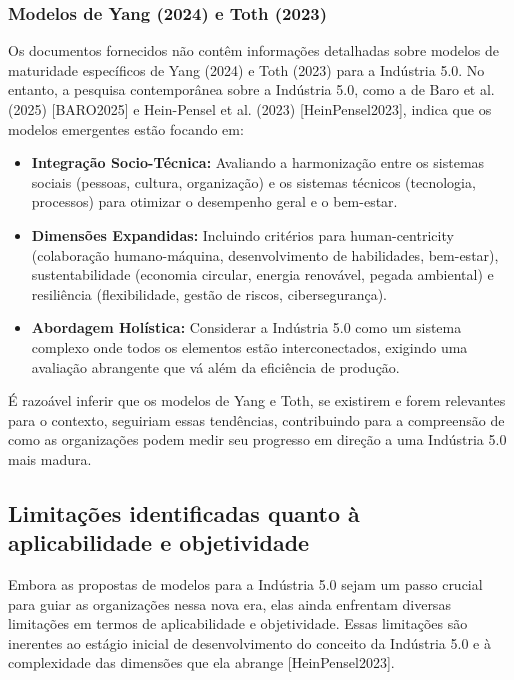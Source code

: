 \subsubsection{Modelos de Yang (2024) e Toth (2023)}

Os documentos fornecidos não contêm informações detalhadas sobre modelos de maturidade específicos de Yang (2024) e Toth (2023) para a Indústria 5.0. No entanto, a pesquisa contemporânea sobre a Indústria 5.0, como a de Baro et al. (2025) [BARO2025] e Hein-Pensel et al. (2023) [HeinPensel2023], indica que os modelos emergentes estão focando em:
\begin{itemize}
    \item \textbf{Integração Socio-Técnica:} Avaliando a harmonização entre os sistemas sociais (pessoas, cultura, organização) e os sistemas técnicos (tecnologia, processos) para otimizar o desempenho geral e o bem-estar.
    \item \textbf{Dimensões Expandidas:} Incluindo critérios para human-centricity (colaboração humano-máquina, desenvolvimento de habilidades, bem-estar), sustentabilidade (economia circular, energia renovável, pegada ambiental) e resiliência (flexibilidade, gestão de riscos, cibersegurança).
    \item \textbf{Abordagem Holística:} Considerar a Indústria 5.0 como um sistema complexo onde todos os elementos estão interconectados, exigindo uma avaliação abrangente que vá além da eficiência de produção.
\end{itemize}

É razoável inferir que os modelos de Yang e Toth, se existirem e forem relevantes para o contexto, seguiriam essas tendências, contribuindo para a compreensão de como as organizações podem medir seu progresso em direção a uma Indústria 5.0 mais madura.

\subsection{Limitações identificadas quanto à aplicabilidade e objetividade}

Embora as propostas de modelos para a Indústria 5.0 sejam um passo crucial para guiar as organizações nessa nova era, elas ainda enfrentam diversas limitações em termos de aplicabilidade e objetividade. Essas limitações são inerentes ao estágio inicial de desenvolvimento do conceito da Indústria 5.0 e à complexidade das dimensões que ela abrange [HeinPensel2023].

